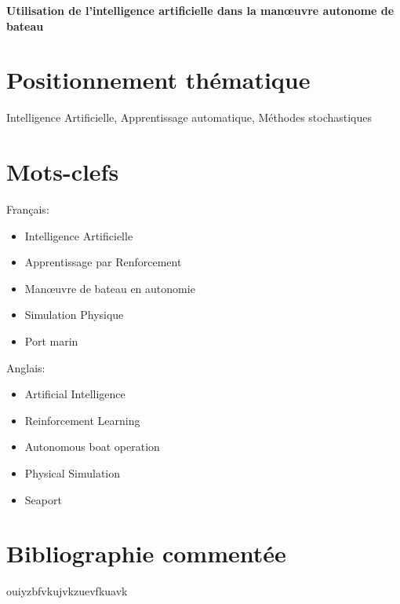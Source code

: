 \documentclass[12pt,a4paper]{extarticle}
\begin{document}
\begin{center}

\huge{ \bfseries Utilisation de l'intelligence artificielle dans la manœuvre autonome de bateau}
\end{center}

\section*{Positionnement thématique}

Intelligence Artificielle, Apprentissage automatique, Méthodes stochastiques

\section*{Mots-clefs}

\begin{multicols}{2}

Français:

\begin{itemize}

\item Intelligence Artificielle
\item Apprentissage par Renforcement
\item Manœuvre de bateau en autonomie
\item Simulation Physique
\item Port marin

\end{itemize}

Anglais:

\begin{itemize}

\item Artificial Intelligence
\item Reinforcement Learning
\item Autonomous boat operation
\item Physical Simulation
\item Seaport

\end{itemize}

\end{multicols}

\section*{Bibliographie commentée}

\indent ouiyzbfvkujvkzuevfkuavk \\
\end{document}

